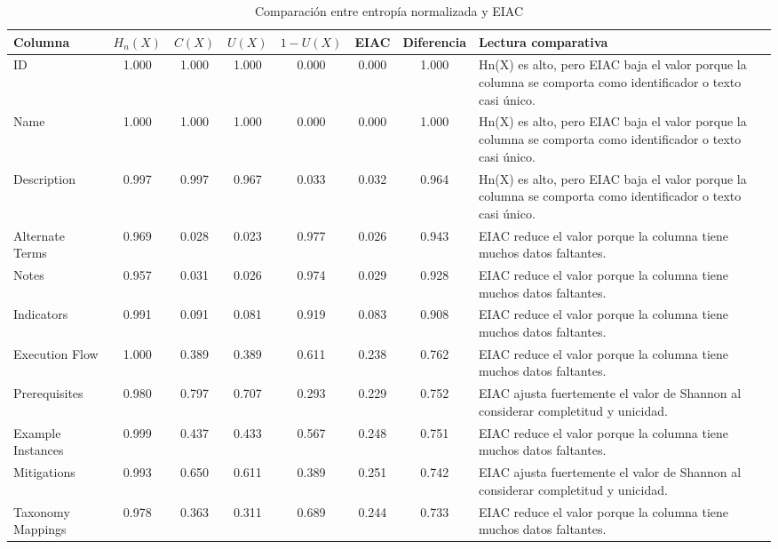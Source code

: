 \begin{table}[h]
\centering
\caption{Comparación entre entropía normalizada y EIAC}
\label{tab:comparacion-hn-eiac-20260624_095401}
\scriptsize
\begin{tabular}{|p{3cm}|c|c|c|c|c|c|p{5cm}|}
\hline
\textbf{Columna} & \textbf{\(H_n(X)\)} & \textbf{\(C(X)\)} & \textbf{\(U(X)\)} & \textbf{\(1-U(X)\)} & \textbf{EIAC} & \textbf{Diferencia} & \textbf{Lectura comparativa} \\
\hline
ID & 1.000 & 1.000 & 1.000 & 0.000 & 0.000 & 1.000 & Hn(X) es alto, pero EIAC baja el valor porque la columna se comporta como identificador o texto casi único. \\
\hline
Name & 1.000 & 1.000 & 1.000 & 0.000 & 0.000 & 1.000 & Hn(X) es alto, pero EIAC baja el valor porque la columna se comporta como identificador o texto casi único. \\
\hline
Description & 0.997 & 0.997 & 0.967 & 0.033 & 0.032 & 0.964 & Hn(X) es alto, pero EIAC baja el valor porque la columna se comporta como identificador o texto casi único. \\
\hline
Alternate Terms & 0.969 & 0.028 & 0.023 & 0.977 & 0.026 & 0.943 & EIAC reduce el valor porque la columna tiene muchos datos faltantes. \\
\hline
Notes & 0.957 & 0.031 & 0.026 & 0.974 & 0.029 & 0.928 & EIAC reduce el valor porque la columna tiene muchos datos faltantes. \\
\hline
Indicators & 0.991 & 0.091 & 0.081 & 0.919 & 0.083 & 0.908 & EIAC reduce el valor porque la columna tiene muchos datos faltantes. \\
\hline
Execution Flow & 1.000 & 0.389 & 0.389 & 0.611 & 0.238 & 0.762 & EIAC reduce el valor porque la columna tiene muchos datos faltantes. \\
\hline
Prerequisites & 0.980 & 0.797 & 0.707 & 0.293 & 0.229 & 0.752 & EIAC ajusta fuertemente el valor de Shannon al considerar completitud y unicidad. \\
\hline
Example Instances & 0.999 & 0.437 & 0.433 & 0.567 & 0.248 & 0.751 & EIAC reduce el valor porque la columna tiene muchos datos faltantes. \\
\hline
Mitigations & 0.993 & 0.650 & 0.611 & 0.389 & 0.251 & 0.742 & EIAC ajusta fuertemente el valor de Shannon al considerar completitud y unicidad. \\
\hline
Taxonomy Mappings & 0.978 & 0.363 & 0.311 & 0.689 & 0.244 & 0.733 & EIAC reduce el valor porque la columna tiene muchos datos faltantes. \\

\end{tabular}
\end{table}
